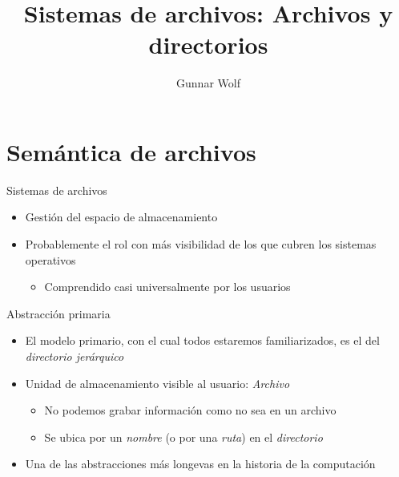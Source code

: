 \documentclass[presentation]{beamer}
\author{Gunnar Wolf}
\date{}
\title{Sistemas de archivos: Archivos y directorios}
\begin{document}
\maketitle

\section{Semántica de archivos}
\label{sec:org54e1d67}

\begin{frame}[label={sec:orgcb2af75}]{Sistemas de archivos}
\begin{itemize}
\item Gestión del espacio de almacenamiento
\item Probablemente el rol con más visibilidad de los que cubren los
sistemas operativos
\begin{itemize}
\item Comprendido casi universalmente por los usuarios
\end{itemize}
\end{itemize}
\end{frame}

\begin{frame}[label={sec:org54c666c}]{Abstracción primaria}
\begin{itemize}
\item El modelo primario, con el cual todos estaremos familiarizados, es
el del \emph{directorio jerárquico}
\item Unidad de almacenamiento visible al usuario: \emph{Archivo}
\begin{itemize}
\item No podemos grabar información como no sea en un archivo
\item Se ubica por un \emph{nombre} (o por una \emph{ruta}) en el \emph{directorio}
\end{itemize}
\item Una de las abstracciones más longevas en la historia de la
computación
\end{itemize}
\end{frame}
\end{document}
